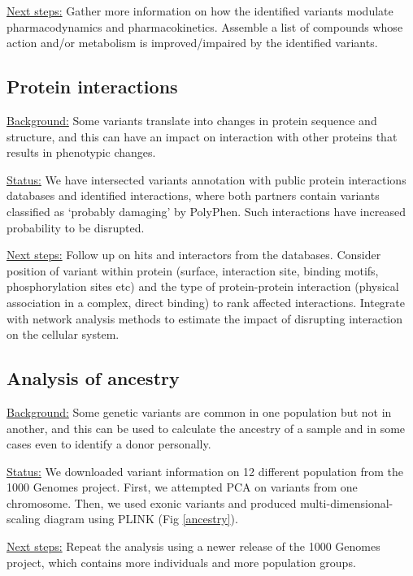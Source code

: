 \documentclass[a4paper,11pt]{TKnotes}
\newcommand{\background}{\vspace*{0.3cm}\noindent\uline{Background:} }
\newcommand{\status}{\vspace*{0.3cm}\noindent\uline{Status:} }
\newcommand{\nextsteps}{\vspace*{0.3cm}\noindent\uline{Next steps:} }
\begin{document}
\nextsteps Gather more information on how the identified variants modulate pharmacodynamics and pharmacokinetics. Assemble a list of compounds whose action and/or metabolism is improved/impaired by the identified variants.




\vspace*{0.5cm}
\subsection{Protein interactions}

\background Some variants translate into changes in protein sequence and structure, and this can have an impact on interaction with other proteins that results in phenotypic changes.

\status We have intersected variants annotation with public protein interactions databases and identified interactions, where both partners contain variants classified as ‘probably damaging’ by PolyPhen. Such interactions have increased probability to be disrupted.

\nextsteps Follow up on hits and interactors from the databases. Consider position of variant within protein (surface, interaction site, binding motifs, phosphorylation sites etc) and the type of protein-protein interaction (physical association in a complex, direct binding) to rank affected interactions. Integrate with network analysis methods to estimate the impact of disrupting interaction on the cellular system.




\vspace*{0.5cm}
\subsection{Analysis of ancestry}

\background Some genetic variants are common in one population but not in another, and this can be used to calculate the ancestry of a sample and in some cases even to identify a donor personally. 

\status We downloaded variant information on 12 different population from the 1000 Genomes project. First, we attempted PCA on variants from one chromosome. Then, we used exonic variants and produced multi-dimensional-scaling diagram using PLINK (Fig \ref{ancestry}). 

\nextsteps Repeat the analysis using a newer release of the 1000 Genomes project, which contains more individuals and more population groups.
\end{document}
